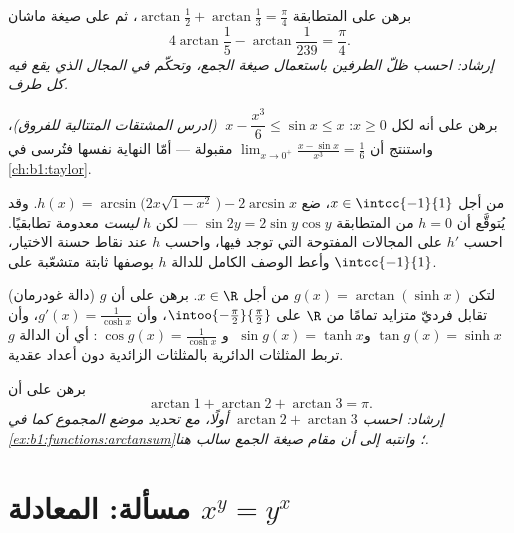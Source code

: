 \begin{exercise}[$\star\star$]\label{exo:b1:functions:8}
برهن على المتطابقة $\arctan\frac{1}{2} + \arctan\frac{1}{3} =
\frac{\pi}{4}$، ثم على صيغة ماشان
\[
4\arctan\frac 15 - \arctan\frac{1}{239} = \frac{\pi}{4}.
\]
\emph{إرشاد: احسب ظلّ الطرفين باستعمال صيغة الجمع، وتحكّم
في المجال الذي يقع فيه كل طرف.}
\end{exercise}

\begin{exercise}[$\star\star$]\label{exo:b1:functions:9}
برهن على أنه لكل $x \geq 0$: $\;x - \dfrac{x^3}{6} \leq \sin x \leq
x$ \emph{(ادرس المشتقات المتتالية للفروق)}، واستنتج
أن $\lim_{x \to 0^+} \frac{x - \sin x}{x^3} = \frac 16$ مقبولة
--- أمّا النهاية نفسها فتُرسى في
\cref{ch:b1:taylor}.
\end{exercise}

\begin{exercise}[$\star\star\star$]\label{exo:b1:functions:10}
من أجل $x \in \intcc{-1}{1}$، ضع
$h(x) = \arcsin\bigl(2x\sqrt{1 - x^2}\,\bigr) - 2\arcsin x$. وقد يُتوقَّع
أن $h = 0$ من المتطابقة $\sin 2y = 2\sin y\cos y$ --- لكن
$h$ \emph{ليست} معدومة تطابقيًا. احسب $h'$ على المجالات المفتوحة
التي توجد فيها، واحسب $h$ عند نقاط حسنة الاختيار، وأعط الوصف الكامل للدالة $h$ بوصفها ثابتة متشعّبة على $\intcc{-1}{1}$.
\end{exercise}

\begin{exercise}[$\star\star\star$]\label{exo:b1:functions:11}
(دالة غودرمان) لتكن $g(x) = \arctan(\sinh x)$ من أجل $x \in \R$. برهن
على أن $g$ تقابل فرديّ متزايد تمامًا من $\R$ على
$\intoo{-\frac\pi2}{\frac\pi2}$، وأن $g'(x) = \frac{1}{\cosh x}$،
وأن $\tan g(x) = \sinh x$ و$\;\sin g(x) = \tanh x$ و
$\;\cos g(x) = \frac{1}{\cosh x}$: أي أن الدالة $g$ تربط المثلثات
الدائرية بالمثلثات الزائدية دون أعداد عقدية.
\end{exercise}

\begin{exercise}[$\star\star$]\label{exo:b1:functions:12}
برهن على أن
\[
\arctan 1 + \arctan 2 + \arctan 3 = \pi .
\]
\emph{إرشاد: احسب $\arctan 2 + \arctan 3$ أولًا، مع تحديد موضع
المجموع كما في \cref{ex:b1:functions:arctansum}؛ وانتبه إلى أن
مقام صيغة الجمع سالب هنا.}
\end{exercise}

\section{مسألة: المعادلة $x^y = y^x$}

